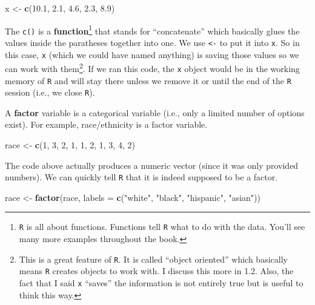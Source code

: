 \documentclass[]{tufte-book}
\newenvironment{Shaded}{}{}
\newcommand{\KeywordTok}[1]{\textcolor[rgb]{0.00,0.44,0.13}{\textbf{#1}}}
\newcommand{\DataTypeTok}[1]{\textcolor[rgb]{0.56,0.13,0.00}{#1}}
\newcommand{\DecValTok}[1]{\textcolor[rgb]{0.25,0.63,0.44}{#1}}
\newcommand{\FloatTok}[1]{\textcolor[rgb]{0.25,0.63,0.44}{#1}}
\newcommand{\StringTok}[1]{\textcolor[rgb]{0.25,0.44,0.63}{#1}}
\newcommand{\NormalTok}[1]{#1}
\theoremstyle{definition}
\theoremstyle{definition}
\theoremstyle{remark}
\begin{document}
\begin{Shaded}
\begin{Highlighting}[]
\NormalTok{x <-}\StringTok{ }\KeywordTok{c}\NormalTok{(}\FloatTok{10.1}\NormalTok{, }\FloatTok{2.1}\NormalTok{, }\FloatTok{4.6}\NormalTok{, }\FloatTok{2.3}\NormalTok{, }\FloatTok{8.9}\NormalTok{)}
\end{Highlighting}
\end{Shaded}

The \texttt{c()} is a \textbf{function}\footnote{\texttt{R} is all about
  functions. Functions tell \texttt{R} what to do with the data. You'll
  see many more examples throughout the book.} that stands for
``concatenate'' which basically glues the values inside the paratheses
together into one. We use \texttt{\textless{}-} to put it into
\texttt{x}. So in this case, \texttt{x} (which we could have named
anything) is saving those values so we can work with them\footnote{This
  is a great feature of \texttt{R}. It is called ``object oriented''
  which basically means \texttt{R} creates objects to work with. I
  discuss this more in 1.2. Also, the fact that I said \texttt{x}
  ``saves'' the information is not entirely true but is useful to think
  this way.}. If we ran this code, the \texttt{x} object would be in the
working memory of \texttt{R} and will stay there unless we remove it or
until the end of the \texttt{R} session (i.e., we close \texttt{R}).

A \textbf{factor} variable is a categorical variable (i.e., only a
limited number of options exist). For example, race/ethnicity is a
factor variable.

\begin{Shaded}
\begin{Highlighting}[]
\NormalTok{race <-}\StringTok{ }\KeywordTok{c}\NormalTok{(}\DecValTok{1}\NormalTok{, }\DecValTok{3}\NormalTok{, }\DecValTok{2}\NormalTok{, }\DecValTok{1}\NormalTok{, }\DecValTok{1}\NormalTok{, }\DecValTok{2}\NormalTok{, }\DecValTok{1}\NormalTok{, }\DecValTok{3}\NormalTok{, }\DecValTok{4}\NormalTok{, }\DecValTok{2}\NormalTok{)}
\end{Highlighting}
\end{Shaded}

The code above actually produces a numeric vector (since it was only
provided numbers). We can quickly tell \texttt{R} that it is indeed
supposed to be a factor.

\begin{Shaded}
\begin{Highlighting}[]
\NormalTok{race <-}\StringTok{ }\KeywordTok{factor}\NormalTok{(race, }\DataTypeTok{labels =} \KeywordTok{c}\NormalTok{(}\StringTok{"white"}\NormalTok{, }\StringTok{"black"}\NormalTok{, }
    \StringTok{"hispanic"}\NormalTok{, }\StringTok{"asian"}\NormalTok{))}
\end{Highlighting}
\end{Shaded}
\end{document}

